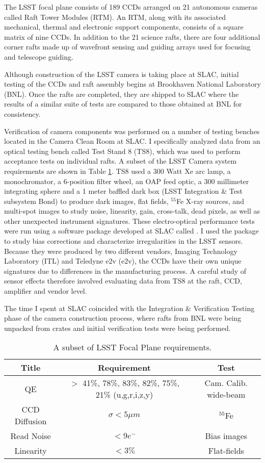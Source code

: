 The LSST focal plane consists of 189 CCDs arranged on 21 autonomous cameras called Raft Tower Modules (RTM). An RTM, along with its associated mechanical, thermal and electronic support components, consists of a square matrix of nine CCDs. In addition to the 21 science rafts, there are four additional corner rafts made up of wavefront sensing and guiding arrays used for focusing and telescope guiding.

Although construction of the LSST camera is taking place at SLAC, initial testing of the CCDs and raft assembly begins at Brookhaven National Laboratory (BNL). Once the rafts are completed, they are shipped to SLAC where the results of a similar suite of tests are compared to those obtained at BNL for consistency.

Verification of camera components was performed on a number of testing benches located in the Camera Clean Room at SLAC. I specifically analyzed data from an optical testing bench called Test Stand 8 (TS8), which was used to perform acceptance tests on individual rafts. A subset of the LSST Camera system requirements are shown in Table \ref{tab:cam-req}. TS8 used a 300 Watt Xe arc lamp, a monochromator, a 6-position filter wheel, an OAP feed optic, a 300 millimeter integrating sphere and a 1 meter baffled dark box (LSST Integration & Test subsystem Bond) to produce dark images, flat fields, $^{55}$Fe X-ray sources, and multi-spot images to study noise, linearity, gain, cross-talk, dead pixels, as well as other unexpected instrument signatures. These electro-optical performance tests were run using a software package developed at SLAC called .  I used the  package to study bias corrections and characterize irregularities in the LSST sensors. Because they were produced by two different vendors, Imaging Technology Laboratory (ITL) and Teledyne e2v (e2v), the CCDs have their own unique signatures due to differences in the manufacturing process. A careful study of sensor effects therefore involved evaluating data from TS8 at the raft, CCD, amplifier and vendor level.

 The time I spent at SLAC coincided with the Integration \& Verification Testing phase of the camera construction process, where rafts from BNL were being unpacked from crates and initial verification tests were being performed.

\begin{table}
\caption{A subset of LSST Focal Plane requirements.}
\label{tab:cam-req}
\centering
\begin{tabular}{|c|c|c|}
  \hline
  Title & Requirement & Test \\
  \hline \hline
  QE & $>$ 41\%, 78\%, 83\%, 82\%, 75\%, 21\% (u,g,r,i,z,y) & Cam. Calib. wide-beam \\
  \hline
  CCD Diffusion & $\sigma < 5\mu m$ & $^{55}$Fe \\
  \hline
  Read Noise & $< 9e^{-}$ & Bias images \\
  \hline
  Linearity & $<3\%$ & Flat-fields\\
  \hline
\end{tabular}
\end{table}\\

